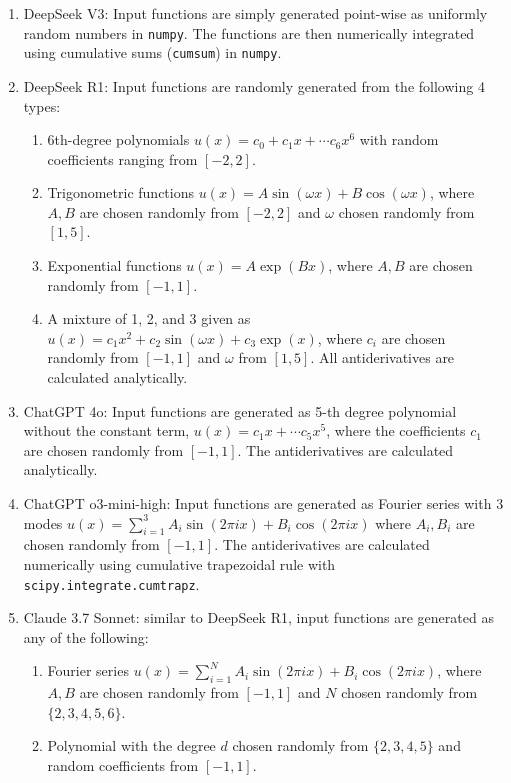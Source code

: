 \documentclass{article}
\begin{document}
\begin{enumerate}
    \item DeepSeek V3: Input functions are simply generated point-wise as uniformly random numbers in \texttt{numpy}. The functions are then numerically integrated using cumulative sums (\texttt{cumsum}) in \texttt{numpy}. 
    \item DeepSeek R1: Input functions are randomly generated from the following 4 types: 
    \begin{enumerate}
        \item 6th-degree polynomials $u(x) = c_0 + c_1x + \cdots c_6 x^6$ with random coefficients ranging from $[-2,2]$. 
        \item Trigonometric functions $u(x) = A \sin(\omega x) + B \cos (\omega x)$, where $A, B$ are chosen randomly from $[-2,2]$ and $\omega$ chosen randomly from $[1,5]$.
        \item Exponential functions $u(x) = A \exp(Bx)$, where $A, B$ are chosen randomly from $[-1,1]$. 
        \item A mixture of 1, 2, and 3 given as $u(x) = c_1 x^2 + c_2 \sin(\omega x) + c_3 \exp(x)$, where $c_i$ are chosen randomly from $[-1,1]$ and $\omega$ from $[1,5]$. All antiderivatives are calculated analytically. 
    \end{enumerate}
    \item ChatGPT 4o: Input functions are generated as 5-th degree polynomial without the constant term, $u(x) = c_1x + \cdots c_5 x^5$, where the coefficients $c_1$ are chosen randomly from $[-1,1]$. The antiderivatives are calculated analytically. 
    \item ChatGPT o3-mini-high: Input functions are generated as Fourier series with 3 modes $u(x) = \sum_{i=1}^3 A_i \sin(2\pi i x) + B_i \cos(2 \pi i x)$ where $A_i, B_i$ are chosen randomly from $[-1,1]$. The antiderivatives are calculated numerically using cumulative trapezoidal rule with  \texttt{scipy.integrate.cumtrapz}. 
    \item Claude 3.7 Sonnet: similar to DeepSeek R1, input functions are generated as any of the following:
    \begin{enumerate}
        \item Fourier series $u(x) = \sum_{i=1}^N A_i \sin(2\pi i x) + B_i \cos(2 \pi i x)$, where $A, B$ are chosen randomly from $[-1,1]$ and $N$ chosen randomly from $\{2,3,4,5,6\}$.
        \item Polynomial with the degree $d$ chosen randomly from $\{2,3,4,5\}$ and random coefficients from $[-1,1]$. 

\end{enumerate}
\end{enumerate}
\end{document}
